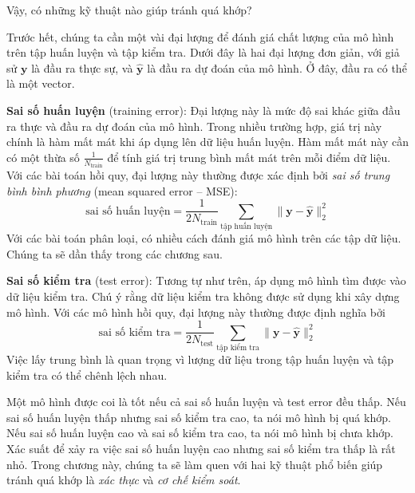 Vậy, có những kỹ thuật nào giúp tránh quá khớp? 
 
Trước hết, chúng ta cần một vài đại lượng để đánh giá chất lượng của mô hình
trên tập huấn luyện và tập kiểm tra. Dưới đây là hai đại lượng đơn giản, với
giả sử $\mathbf{y}$ là đầu ra thực sự, và $\mathbf{\hat{y}}$ là đầu ra dự đoán
của mô hình. Ở đây, đầu ra có thể là một vector.
 
\textbf{Sai số huấn luyện} (training error): Đại lượng này là mức độ sai khác giữa đầu ra thực và đầu
ra dự đoán của mô hình. Trong nhiều trường hợp, giá trị này chính là hàm mất mát khi áp dụng lên dữ liệu huấn luyện. Hàm mất mát này cần có một thừa số $\displaystyle
\frac{1}{N_{\text{train}}}$ để tính giá trị trung bình mất mát
trên mỗi điểm dữ liệu. Với các bài toán hồi quy, đại lượng này thường được xác định bởi \textit{sai số trung bình bình phương} ({mean squared error -- MSE}):
\begin{equation*} 
\text{sai số huấn luyện}= \frac{1}{2N_{\text{train}}} \sum_{\text{tập huấn luyện}}
\|\mathbf{y} - \mathbf{\hat{y}}\|_2^2 
\end{equation*} 
Với các bài toán phân loại, có nhiều cách đánh giá mô hình trên các tập dữ liệu. Chúng ta sẽ dần thấy trong các chương sau.  

\textbf{Sai số kiểm tra} (test error): Tương tự như trên, áp dụng mô hình tìm được vào dữ liệu kiểm tra. Chú ý rằng dữ liệu kiểm tra không được sử dụng khi xây dựng mô hình. Với các mô hình hồi quy, đại lượng này thường được định nghĩa bởi 
\begin{equation*} 
\text{sai số kiểm tra}= \frac{1}{2N_{\text{test}}} \sum_{\text{tập kiểm tra}} \|\mathbf{y} - \mathbf{\hat{y}}\|_2^2 
\end{equation*} 
{Việc lấy trung bình là quan trọng vì lượng dữ liệu trong tập huấn
luyện và tập kiểm tra có thể chênh lệch nhau.}
 
Một mô hình được coi là tốt nếu cả {sai số huấn luyện} và {test
error} đều thấp. Nếu {sai số huấn luyện} thấp nhưng {sai số kiểm tra} cao,
ta nói mô hình bị quá khớp. Nếu {sai số huấn luyện} cao và {sai số kiểm tra} cao, ta nói mô hình bị chưa khớp. Xác suất để xảy ra việc
{sai số huấn luyện} cao nhưng {sai số kiểm tra} thấp là rất nhỏ.
Trong chương này, chúng ta sẽ làm quen với hai kỹ thuật phổ biến giúp tránh
quá khớp là \textit{xác thực} và \textit{cơ chế kiểm soát}.
 
